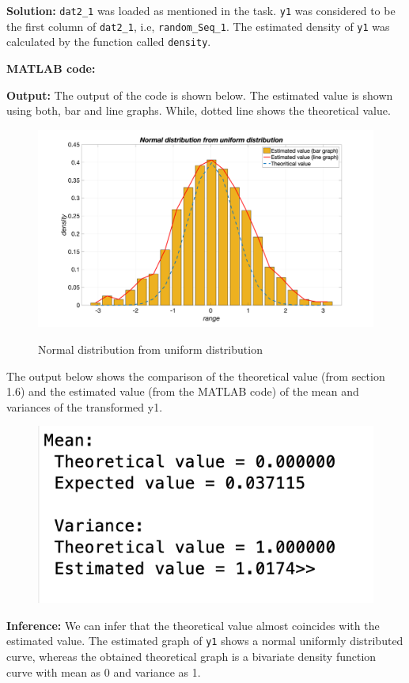 \noindent \textbf{Solution:} \texttt{dat2\_1} was loaded as mentioned in the task. \texttt{y1} was considered to be the first column of \texttt{dat2\_1}, i.e, \texttt{random\_Seq\_1}. The estimated density of \texttt{y1} was calculated by the function called \texttt{density}.

\noindent \textbf{MATLAB code:} 


\noindent \textbf{Output:} The output of the code is shown below. The estimated value is shown using both, bar and line graphs. While, dotted line shows the theoretical value.
\begin{figure}[H]
\centering
{\includegraphics[scale=0.16]{ass6_1.png}}
\caption{Normal distribution from uniform distribution }
\label{Normal distribution from uniform distribution }
\end{figure}

\noindent The output below shows the comparison of the theoretical value (from section 1.6) and the estimated value (from the MATLAB code) of the mean and variances of the transformed y1.
\begin{figure}[H]
\centering
{\includegraphics[scale=0.63]{ass6_2.png}}
\end{figure}

\noindent \textbf{Inference:} We can infer that the theoretical value almost coincides with the estimated value. The estimated graph of \texttt{y1} shows a normal uniformly distributed curve, whereas the obtained theoretical graph is a bivariate density function curve with mean as 0 and variance as 1.
